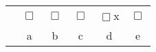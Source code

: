 \begin{center}
\begin{tabular}{c c c c c c}
& $\Box$ & $\Box$  & $\Box$   & $\Box$\hspace{-0.25cm}x    & $\Box$  \\
& a & b  & c  & d  & e \\
\end{tabular}
\end{center}
